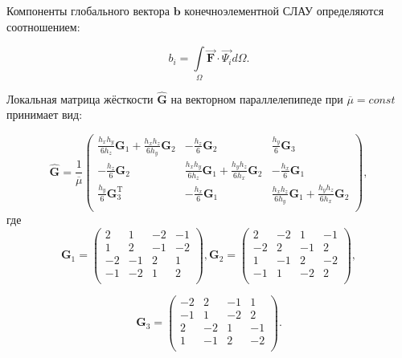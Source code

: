 Компоненты глобального вектора $\textbf{b}$ конечноэлементной СЛАУ определяются соотношением:

\begin{equation} \label{eq_1_15}
	b_{i} = \int \limits_{\Omega} \overrightarrow{\textbf{F}} \cdot \overrightarrow{\textbf{$\Psi_i$}} d \Omega.
\end{equation}

Локальная матрица жёсткости $\hat{\textbf{G}}$ на векторном параллелепипеде при $\overline{\mu} = const$ принимает вид:

\begin{equation*}
	\hat{\textbf{G}} = \frac{1}{\overline{\mu}} \left(
	\begin{array}{ccc}
		\frac{h_x h_y}{6h_z}\textbf{G}_1 + \frac{h_x h_z}{6h_y}\textbf{G}_2 & -\frac{h_z}{6}\textbf{G}_2 & \frac{h_y}{6}\textbf{G}_3 \\
		-\frac{h_z}{6}\textbf{G}_2 & \frac{h_x h_y}{6h_z}\textbf{G}_1 + \frac{h_y h_z}{6h_x}\textbf{G}_2 & -\frac{h_x}{6}\textbf{G}_1 \\
		\frac{h_y}{6}\textbf{G}^\text{T}_3 & -\frac{h_x}{6}\textbf{G}_1 & \frac{h_x h_z}{6h_y}\textbf{G}_1 + \frac{h_y h_z}{6h_x}\textbf{G}_2 \\
	\end{array}
	\right),
\end{equation*}
где
\begin{equation*}
	\textbf{G}_1 = \left(
	\begin{array}{rrrr}
		 2 & 1 & -2 & -1 \\
		 1 & 2 & -1 & -2 \\
		 -2 & -1 & 2 & 1 \\
		 -1 & -2 & 1 & 2 \\
	\end{array}
	\right),
	\textbf{G}_2 = \left(
	\begin{array}{rrrr}
		2 & -2 & 1 & -1 \\
		-2 & 2 & -1 & 2 \\
		1 & -1 & 2 & -2 \\
		-1 & 1 & -2 & 2 \\
	\end{array}
	\right),
\end{equation*}

\begin{equation*}
	\textbf{G}_3 = \left(
	\begin{array}{rrrr}
		-2 & 2 & -1 & 1 \\
		-1 & 1 & -2 & 2 \\
		2 & -2 & 1 & -1 \\
		1 & -1 & 2 & -2 \\
	\end{array}
	\right).
\end{equation*}

